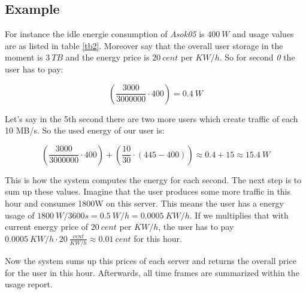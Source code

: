   \subsection{Example}
    For instance the idle energie consumption of \textit{Asok05} is $400\ W$ and usage values are as listed in table \ref{tb2}. Moreover say that the overall user storage in the moment is $3\ TB$ and the energy price is $20\ cent$ per $KW/h$. So for second \textit{0} the user has to pay:
    
     $$(\frac{3000}{3000000} \cdot 400) = 0.4\ W $$
    
    Let's say in the 5th second there are two more users which create traffic of each 10 MB/s. So the used energy of our user is:
    
     $$(\frac{3000}{3000000} \cdot 400) + (\frac{10}{30} \cdot (445 - 400))  \approx 0.4 + 15 \approx 15.4\ W $$
           
  	This is how the system computes the energy for each second. The next step is to sum up these values. Imagine that the user produces some more traffic in this hour and consumes 1800W on this server. This means the user has a energy usage of $1800\ W / 3600s = 0.5\ W/h = 0.0005 \ KW/h$. If we multiplies that with current energy price of $20\ cent$ per $KW/h$, the user has to pay $ 0.0005\ KW/h \cdot 20\ \frac{cent}{KW/h} \approx 0.01\ cent$ for this hour.
  	
  	Now the system sums up this prices of each server and returns the overall price for the user in this hour. Afterwards, all time frames are summarized within the usage report.
